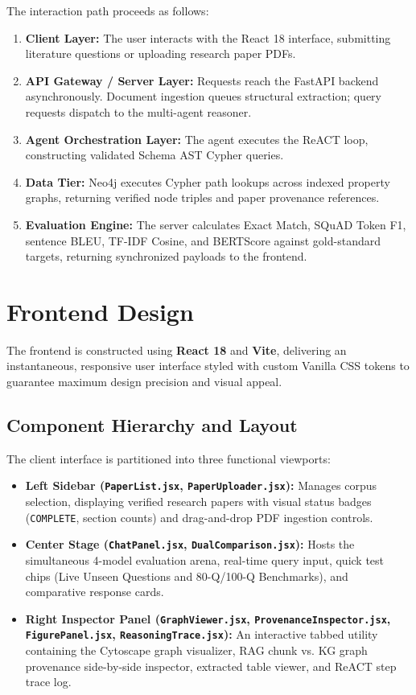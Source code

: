 \documentclass[12pt,a4paper,oneside]{report}
\begin{document}
The interaction path proceeds as follows:
\begin{enumerate}
    \item \textbf{Client Layer:} The user interacts with the React 18 interface, submitting literature questions or uploading research paper PDFs.
    \item \textbf{API Gateway / Server Layer:} Requests reach the FastAPI backend asynchronously. Document ingestion queues structural extraction; query requests dispatch to the multi-agent reasoner.
    \item \textbf{Agent Orchestration Layer:} The agent executes the ReACT loop, constructing validated Schema AST Cypher queries.
    \item \textbf{Data Tier:} Neo4j executes Cypher path lookups across indexed property graphs, returning verified node triples and paper provenance references.
    \item \textbf{Evaluation Engine:} The server calculates Exact Match, SQuAD Token F1, sentence BLEU, TF-IDF Cosine, and BERTScore against gold-standard targets, returning synchronized payloads to the frontend.
\end{enumerate}

\section{Frontend Design}
The frontend is constructed using \textbf{React 18} and \textbf{Vite}, delivering an instantaneous, responsive user interface styled with custom Vanilla CSS tokens to guarantee maximum design precision and visual appeal.

\subsection{Component Hierarchy and Layout}
The client interface is partitioned into three functional viewports:
\begin{itemize}
    \item \textbf{Left Sidebar (\texttt{PaperList.jsx}, \texttt{PaperUploader.jsx}):} Manages corpus selection, displaying verified research papers with visual status badges (\texttt{COMPLETE}, section counts) and drag-and-drop PDF ingestion controls.
    \item \textbf{Center Stage (\texttt{ChatPanel.jsx}, \texttt{DualComparison.jsx}):} Hosts the simultaneous 4-model evaluation arena, real-time query input, quick test chips (Live Unseen Questions and 80-Q/100-Q Benchmarks), and comparative response cards.
    \item \textbf{Right Inspector Panel (\texttt{GraphViewer.jsx}, \texttt{ProvenanceInspector.jsx}, \texttt{FigurePanel.jsx}, \texttt{ReasoningTrace.jsx}):} An interactive tabbed utility containing the Cytoscape graph visualizer, RAG chunk vs. KG graph provenance side-by-side inspector, extracted table viewer, and ReACT step trace log.
\end{itemize}
\end{document}
